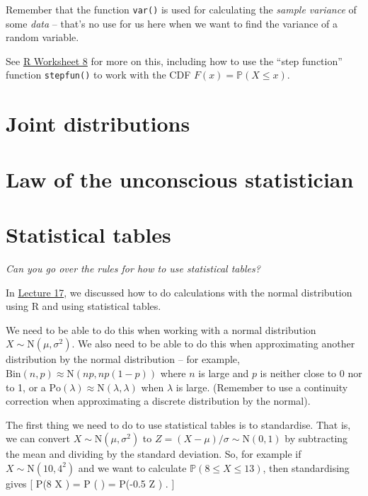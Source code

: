 \documentclass[
  letterpaper,
  DIV=11,
  numbers=noendperiod]{scrreprt}
\theoremstyle{remark}
\begin{document}
Remember that the function \texttt{var()} is used for calculating the
\emph{sample variance} of some \emph{data} -- that's no use for us here
when we want to find the variance of a random variable.

See \protect\hyperlink{R}{R Worksheet 8} for more on this, including how
to use the ``step function'' function \texttt{stepfun()} to work with
the CDF \(F(x) = \mathbb P(X \leq x)\).

\hypertarget{joint-distributions}{%
\section{Joint distributions}\label{joint-distributions}}

\hypertarget{law-of-the-unconscious-statistician}{%
\section{Law of the unconscious
statistician}\label{law-of-the-unconscious-statistician}}

\hypertarget{statistical-tables}{%
\section{Statistical tables}\label{statistical-tables}}

\emph{Can you go over the rules for how to use statistical tables?}

In \protect\hyperlink{L17-normal}{Lecture 17}, we discussed how to do
calculations with the normal distribution using R and using statistical
tables.

We need to be able to do this when working with a normal distribution
\(X \sim \mathrm{N}(\mu, \sigma^2)\). We also need to be able to do this
when approximating another distribution by the normal distribution --
for example, \(\mathrm{Bin}(n,p) \approx \mathrm{N}(np, np(1-p))\) where
\(n\) is large and \(p\) is neither close to 0 nor to 1, or a
\(\mathrm{Po}(\lambda) \approx \mathrm{N}(\lambda,\lambda)\) when
\(\lambda\) is large. (Remember to use a continuity correction when
approximating a discrete distribution by the normal).

The first thing we need to do to use statistical tables is to
standardise. That is, we can convert
\(X \sim \mathrm{N}(\mu, \sigma^2)\) to
\(Z = (X - \mu)/\sigma \sim \mathrm{N}(0,1)\) by subtracting the mean
and dividing by the standard deviation. So, for example if
\(X \sim \mathrm{N}(10, 4^2)\) and we want to calculate
\(\mathbb P(8 \leq X \leq 13)\), then standardising gives {[}
\mathbb P(8 \leq X ) = \mathbb P \left( 
\leq {} \leq {} \right) = \mathbb P(-0.5
\leq Z ) . {]}
\end{document}
